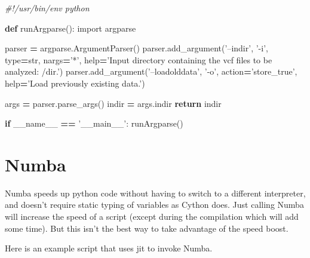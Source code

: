 \documentclass[]{book}
\newenvironment{Shaded}{\begin{snugshade}}{\end{snugshade}}
\newcommand{\KeywordTok}[1]{\textcolor[rgb]{0.13,0.29,0.53}{\textbf{#1}}}
\newcommand{\StringTok}[1]{\textcolor[rgb]{0.31,0.60,0.02}{#1}}
\newcommand{\ImportTok}[1]{#1}
\newcommand{\CommentTok}[1]{\textcolor[rgb]{0.56,0.35,0.01}{\textit{#1}}}
\newcommand{\VariableTok}[1]{\textcolor[rgb]{0.00,0.00,0.00}{#1}}
\newcommand{\ControlFlowTok}[1]{\textcolor[rgb]{0.13,0.29,0.53}{\textbf{#1}}}
\newcommand{\OperatorTok}[1]{\textcolor[rgb]{0.81,0.36,0.00}{\textbf{#1}}}
\newcommand{\BuiltInTok}[1]{#1}
\newcommand{\NormalTok}[1]{#1}
\begin{document}
\begin{Shaded}
\begin{Highlighting}[]
\CommentTok{#!/usr/bin/env python}

\KeywordTok{def}\NormalTok{ runArgparse():}
\ImportTok{import}\NormalTok{ argparse}

\NormalTok{parser }\OperatorTok{=}\NormalTok{ argparse.ArgumentParser()}
\NormalTok{parser.add_argument(}\StringTok{'--indir'}\NormalTok{, }\StringTok{'-i'}\NormalTok{, }\BuiltInTok{type}\OperatorTok{=}\BuiltInTok{str}\NormalTok{, nargs}\OperatorTok{=}\StringTok{'*'}\NormalTok{, }\BuiltInTok{help}\OperatorTok{=}\StringTok{'Input directory containing the vcf files to be analyzed: /dir.'}\NormalTok{)}
\NormalTok{parser.add_argument(}\StringTok{'--loadolddata'}\NormalTok{, }\StringTok{'-o'}\NormalTok{, action}\OperatorTok{=}\StringTok{'store_true'}\NormalTok{, }\BuiltInTok{help}\OperatorTok{=}\StringTok{'Load previously existing data.'}\NormalTok{)}

\NormalTok{args }\OperatorTok{=}\NormalTok{ parser.parse_args()}
\NormalTok{indir }\OperatorTok{=}\NormalTok{ args.indir}
\ControlFlowTok{return}\NormalTok{ indir}

\ControlFlowTok{if} \VariableTok{__name__} \OperatorTok{==} \StringTok{'__main__'}\NormalTok{:}
\NormalTok{    runArgparse()}
\end{Highlighting}
\end{Shaded}

\section{Numba}\label{numba}

Numba speeds up python code without having to switch to a different
interpreter, and doesn't require static typing of variables as Cython
does. Just calling Numba will increase the speed of a script (except
during the compilation which will add some time). But this isn't the
best way to take advantage of the speed boost.

Here is an example script that uses jit to invoke Numba.
\end{document}
